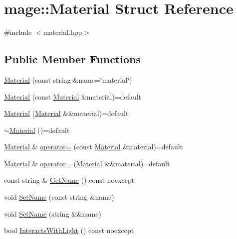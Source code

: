 \hypertarget{structmage_1_1_material}{}\section{mage\+:\+:Material Struct Reference}
\label{structmage_1_1_material}


{\ttfamily \#include $<$material.\+hpp$>$}

\subsection*{Public Member Functions}
\begin{DoxyCompactItemize}
\item 
\hyperlink{structmage_1_1_material_aedc095c81f55be41533dbdf69d36df84}{Material} (const string \&name=\char`\"{}material\char`\"{})
\item 
\hyperlink{structmage_1_1_material_abed630412cdc4a6281389d128ec4b5f3}{Material} (const \hyperlink{structmage_1_1_material}{Material} \&material)=default
\item 
\hyperlink{structmage_1_1_material_a41bfbc2bfa16e3694ac443d390b804c2}{Material} (\hyperlink{structmage_1_1_material}{Material} \&\&material)=default
\item 
\hyperlink{structmage_1_1_material_a4ca65b7e24144ee08dd1ce8d0eda9284}{$\sim$\+Material} ()=default
\item 
\hyperlink{structmage_1_1_material}{Material} \& \hyperlink{structmage_1_1_material_a7ebc9986924ca13ae8468005518dcfc7}{operator=} (const \hyperlink{structmage_1_1_material}{Material} \&material)=default
\item 
\hyperlink{structmage_1_1_material}{Material} \& \hyperlink{structmage_1_1_material_a500a2ebe99d4d7b3be5bf57b6bff62a1}{operator=} (\hyperlink{structmage_1_1_material}{Material} \&\&material)=default
\item 
const string \& \hyperlink{structmage_1_1_material_a9edb2f437eca07c6c12c24d10ec30eb3}{Get\+Name} () const noexcept
\item 
void \hyperlink{structmage_1_1_material_a4795f7aa36a445c09af6268a4af8cb61}{Set\+Name} (const string \&name)
\item 
void \hyperlink{structmage_1_1_material_ad612e4174b030bb002cedaf054e18f82}{Set\+Name} (string \&\&name)
\item 
bool \hyperlink{structmage_1_1_material_a9bb48fe0f9f8d2c21073bdf650957bd6}{Interacts\+With\+Light} () const noexcept
\item 

\end{DoxyCompactItemize}
